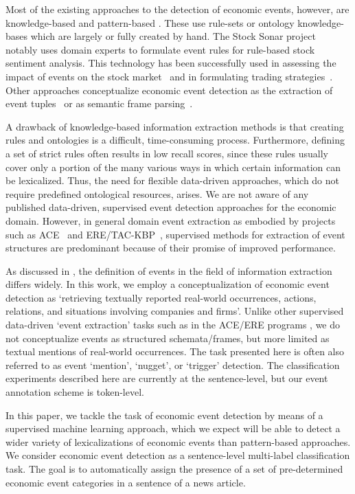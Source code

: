 \documentclass[11pt,a4paper]{article}
\begin{document}
Most of the existing approaches to the detection of economic events, however, are knowledge-based and pattern-based \cite{Arendarenko2012, Hogenboom2013, du2016puls}.
These use rule-sets or ontology knowledge-bases which are largely or fully created by hand.
The Stock Sonar project~\cite{feldman2011stock} notably uses domain experts to formulate event rules for rule-based stock sentiment analysis.
This technology has been successfully used in assessing the impact of events on the stock market~\cite{boudoukh2016information} and in formulating trading strategies~\cite{ben2017event}.
Other approaches conceptualize economic event detection as the extraction of event tuples~\cite{Ding:2015:DLE:2832415.2832572} or as semantic frame parsing~\cite{xie2013semantic}.

A drawback of knowledge-based information extraction methods is that creating rules and ontologies is a difficult, time-consuming process.
Furthermore, defining a set of strict rules often results in low recall scores, since these rules usually cover only a portion of the many various ways in which certain information can be lexicalized.
Thus, the need for flexible data-driven approaches, which do not require predefined ontological resources, arises. We are not aware of any published data-driven, supervised event detection approaches for the economic domain. However, in general domain event extraction as embodied by projects such as ACE~\cite{ahn2006stages} and ERE/TAC-KBP~\cite{mitamura2016overview}, supervised methods for extraction of event structures are predominant because of their promise of improved performance.

As discussed in \citet{sprugnoli2017one}, the definition of events in the field of information extraction differs widely.
In this work, we employ a conceptualization of economic event detection as `retrieving textually reported real-world occurrences, actions, relations, and situations involving companies and firms'.
Unlike other supervised data-driven `event extraction' tasks such as in the ACE/ERE programs \cite{aguilar2014comparison}, we do not conceptualize events as structured schemata/frames, but more limited as textual mentions of real-world occurrences.
The task presented here is often also referred to as event `mention', `nugget', or `trigger' detection.
The classification experiments described here are currently at the sentence-level, but our event annotation scheme is token-level.

In this paper, we tackle the task of economic event detection by means of a supervised machine learning approach, which we expect will be able to detect a wider variety of lexicalizations of economic events than pattern-based approaches.
We consider economic event detection as a sentence-level multi-label classification task.
The goal is to automatically assign the presence of a set of pre-determined economic event categories in a sentence of a news article.
\end{document}
